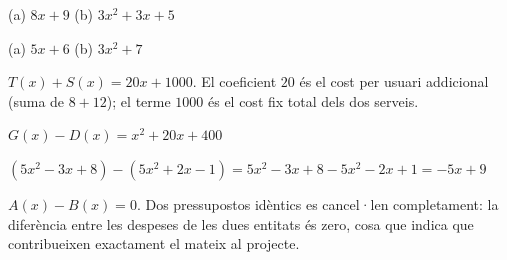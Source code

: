\begin{solucions}
\begin{sollist}
  \item (a) $8x+9$ \quad (b) $3x^2+3x+5$
  \item (a) $5x+6$ \quad (b) $3x^2+7$
  \item $T(x)+S(x) = 20x+\num{1000}$. El coeficient $20$ és el cost per usuari
        addicional (suma de $8+12$); el terme $\num{1000}$ és el cost fix total
        dels dos serveis.
  \item $G(x)-D(x) = x^2+20x+400$
  \item $(5x^2-3x+8)-(5x^2+2x-1) = 5x^2-3x+8-5x^2-2x+1 = -5x+9$
  \item $A(x)-B(x)=0$. Dos pressupostos idèntics es cancel·len completament:
        la diferència entre les despeses de les dues entitats és zero, cosa que
        indica que contribueixen exactament el mateix al projecte.
\end{sollist}
\end{solucions}
